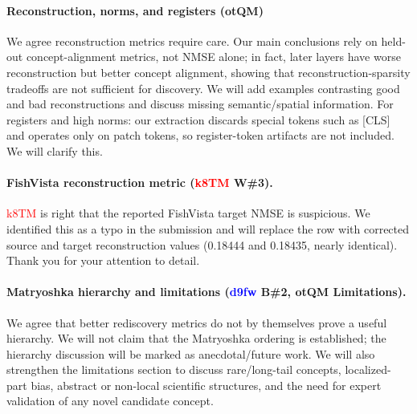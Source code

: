 \documentclass[10pt,twocolumn,letterpaper]{article}
\newcommand{\kTM}{\textcolor{red}{k8TM}}
\newcommand{\dfw}{\textcolor{blue}{d9fw}}
\newcommand{\otQM}{\textcolor{reviewgreen}{otQM}}
\begin{document}
\paragraph{Reconstruction, norms, and registers (\otQM{})}
We agree reconstruction metrics require care.
Our main conclusions rely on held-out concept-alignment metrics, not NMSE alone; in fact, later layers have worse reconstruction but better concept alignment, showing that reconstruction-sparsity tradeoffs are not sufficient for discovery.
We will add examples contrasting good and bad reconstructions and discuss missing semantic/spatial information.
For registers and high norms: our extraction discards special tokens such as [CLS] and operates only on patch tokens, so register-token artifacts are not included.
We will clarify this.

\paragraph{FishVista reconstruction metric (\kTM{} W\#3).}
\kTM{} is right that the reported FishVista target NMSE is suspicious.
We identified this as a typo in the submission and will replace the row with corrected source and target reconstruction values (0.18444 and 0.18435, nearly identical). 
Thank you for your attention to detail.

\paragraph{Matryoshka hierarchy and limitations (\dfw{} B\#2, \otQM{} \textbf{Limitations}).}
We agree that better rediscovery metrics do not by themselves prove a useful hierarchy.
We will not claim that the Matryoshka ordering is established; the hierarchy discussion will be marked as anecdotal/future work.
We will also strengthen the limitations section to discuss rare/long-tail concepts, localized-part bias, abstract or non-local scientific structures, and the need for expert validation of any novel candidate concept.
\end{document}
